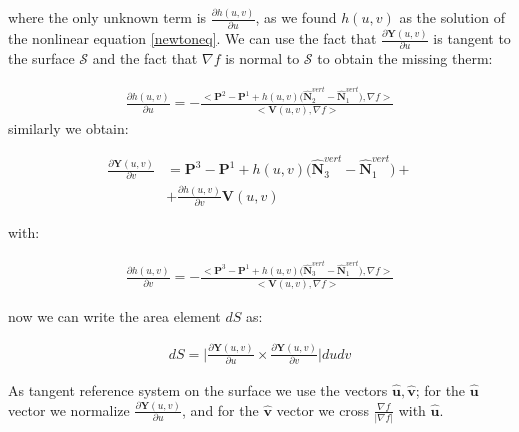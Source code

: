 \documentclass[11pt]{article}
\newcommand\bP{\boldsymbol P}
\newcommand\bN{\boldsymbol N}
\newcommand\bY{\boldsymbol Y}
\newcommand\bV{\boldsymbol V}
\newcommand\bu{\boldsymbol u}
\newcommand\bv{\boldsymbol v}
\begin{document}
where the only unknown term is $\frac{\partial h(u,v)}{\partial u}$, as we found $h(u,v)$ as the solution of the nonlinear equation \ref{newtoneq}. We can use the fact that $\frac{\partial\bY(u,v)}{\partial u}$ is tangent to the surface $\mathcal{S}$ and the fact that $\nabla f$ is normal to $\mathcal{S}$ to obtain the missing therm:

\begin{equation}\label{U_vector_2}
\begin{aligned}
\frac{\partial h(u,v)}{\partial u}=-\frac{<\bP^2-\bP^1+h(u,v)\Big(\hat{\bN}^{vert}_2-\hat{\bN}^{vert}_1\Big),\nabla f>}{<\bV(u,v),\nabla f>}
\end{aligned}
\end{equation}
similarly we obtain:

\begin{equation}\label{V_vector}
\begin{aligned}
\frac{\partial\bY(u,v)}{\partial v}&=\bP^3-\bP^1+h(u,v)\Big(\hat{\bN}^{vert}_3-\hat{\bN}^{vert}_1\Big)+\\
&+\frac{\partial h(u,v)}{\partial v}\bV(u,v)
\end{aligned}
\end{equation}

with:

\begin{equation}\label{V_vector_2}
\begin{aligned}
\frac{\partial h(u,v)}{\partial v}=-\frac{<\bP^3-\bP^1+h(u,v)\Big(\hat{\bN}^{vert}_3-\hat{\bN}^{vert}_1\Big),\nabla f>}{<\bV(u,v),\nabla f>}
\end{aligned}
\end{equation}


now we can write the area element $dS$ as:

\begin{equation}\label{dS}
\begin{aligned}
 dS=\Bigg|\frac{\partial\bY(u,v)}{\partial u}\times\frac{\partial\bY(u,v)}{\partial v}\Bigg|dudv
\end{aligned}
\end{equation}
  
 
 
As tangent reference system on the surface we use the vectors $\hat{\bu}, \hat{\bv}$; for the  $\hat{\bu}$ vector we normalize $\frac{\partial\bY(u,v)}{\partial u}$, and for the $\hat{\bv}$ vector we cross $\frac{\nabla f}{|\nabla f|}$ with $\hat{\bu}$.
\end{document}
